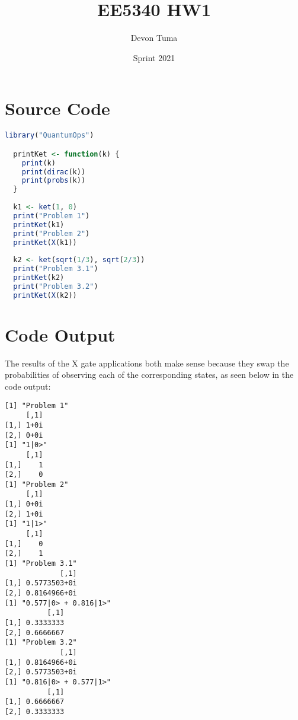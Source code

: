 \documentclass[11pt]{article}
\title{EE5340 HW1}
\author{Devon Tuma}
\date{Sprint 2021}
\begin{document}
\maketitle

\section*{Source Code}

\begin{lstlisting}[language=R]
  library("QuantumOps")

  printKet <- function(k) {
    print(k)
    print(dirac(k))
    print(probs(k))
  }
  
  k1 <- ket(1, 0)
  print("Problem 1")
  printKet(k1)
  print("Problem 2")
  printKet(X(k1))
  
  k2 <- ket(sqrt(1/3), sqrt(2/3))
  print("Problem 3.1")
  printKet(k2)
  print("Problem 3.2")
  printKet(X(k2))
\end{lstlisting}

\section*{Code Output}

The results of the X gate applications both make sense because they swap the probabilities of observing each of the corresponding states, as seen below in the code output:

\begin{verbatim}
[1] "Problem 1"
     [,1]
[1,] 1+0i
[2,] 0+0i
[1] "1|0>"
     [,1]
[1,]    1
[2,]    0
[1] "Problem 2"
     [,1]
[1,] 0+0i
[2,] 1+0i
[1] "1|1>"
     [,1]
[1,]    0
[2,]    1
[1] "Problem 3.1"
             [,1]
[1,] 0.5773503+0i
[2,] 0.8164966+0i
[1] "0.577|0> + 0.816|1>"
          [,1]
[1,] 0.3333333
[2,] 0.6666667
[1] "Problem 3.2"
             [,1]
[1,] 0.8164966+0i
[2,] 0.5773503+0i
[1] "0.816|0> + 0.577|1>"
          [,1]
[1,] 0.6666667
[2,] 0.3333333
\end{verbatim}
\end{document}
